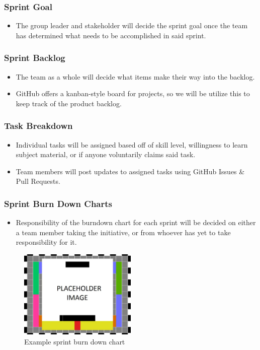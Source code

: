\subsubsection{Sprint Goal}
\begin{itemize}
  \item The group leader and stakeholder will decide the sprint goal once the team has determined what needs to be accomplished in said sprint.
\end{itemize}

\subsubsection{Sprint Backlog}
\begin{itemize}
  \item The team as a whole will decide what items make their way into the backlog.
  \item GitHub offers a kanban-style board for projects, so we will be utilize this to keep track of the product backlog.
\end{itemize}

\subsubsection{Task Breakdown}
\begin{itemize}
  \item Individual tasks will be assigned based off of skill level, willingness to learn subject material, or if anyone voluntarily claims said task.
  \item Team members will post updates to assigned tasks using GitHub Issues & Pull Requests.
\end{itemize}

\subsubsection{Sprint Burn Down Charts}
\begin{itemize}
  \item Responsibility of the burndown chart for each sprint will be decided on either a team member taking the initiative, or from whoever has yet to take responsibility for it.
\end{itemize}

\begin{figure}[h!]
    \centering
    \includegraphics[width=0.5\textwidth]{images/test_image}
    \caption{Example sprint burn down chart}
\end{figure}

